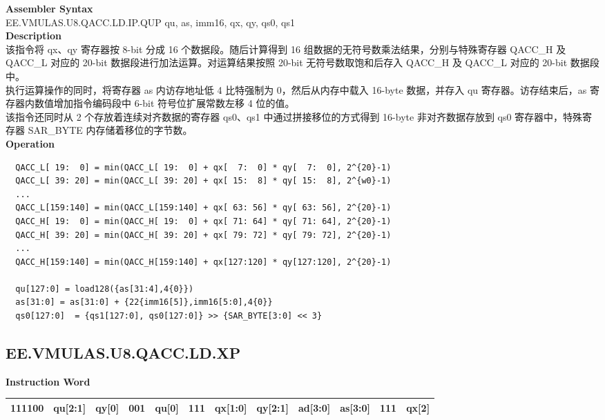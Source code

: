 \textbf{Assembler Syntax} \\
EE.VMULAS.U8.QACC.LD.IP.QUP qu, as, imm16, qx, qy, qs0, qs1 \\
\textbf{Description} \\
该指令将 qx、qy 寄存器按 8-bit 分成 16 个数据段。随后计算得到 16 组数据的无符号数乘法结果，分别与特殊寄存器 QACC\_H 及 QACC\_L 对应的 20-bit 数据段进行加法运算。对运算结果按照 20-bit 无符号数取饱和后存入 QACC\_H 及 QACC\_L 对应的 20-bit 数据段中。\\
执行运算操作的同时，将寄存器 as 内访存地址低 4 比特强制为 0，然后从内存中载入 16-byte 数据，并存入 qu 寄存器。访存结束后，as 寄存器内数值增加指令编码段中 6-bit 符号位扩展常数左移 4 位的值。\\
该指令还同时从 2 个存放着连续对齐数据的寄存器 qs0、qs1 中通过拼接移位的方式得到 16-byte 非对齐数据存放到 qs0 寄存器中，特殊寄存器 SAR\_BYTE 内存储着移位的字节数。\\
\textbf{Operation}
\begin{lstlisting}
  QACC_L[ 19:  0] = min(QACC_L[ 19:  0] + qx[  7:  0] * qy[  7:  0], 2^{20}-1)
  QACC_L[ 39: 20] = min(QACC_L[ 39: 20] + qx[ 15:  8] * qy[ 15:  8], 2^{w0}-1)
  ...
  QACC_L[159:140] = min(QACC_L[159:140] + qx[ 63: 56] * qy[ 63: 56], 2^{20}-1)
  QACC_H[ 19:  0] = min(QACC_H[ 19:  0] + qx[ 71: 64] * qy[ 71: 64], 2^{20}-1)
  QACC_H[ 39: 20] = min(QACC_H[ 39: 20] + qx[ 79: 72] * qy[ 79: 72], 2^{20}-1)
  ...
  QACC_H[159:140] = min(QACC_H[159:140] + qx[127:120] * qy[127:120], 2^{20}-1)

  qu[127:0] = load128({as[31:4],4{0}})
  as[31:0] = as[31:0] + {22{imm16[5]},imm16[5:0],4{0}}
  qs0[127:0]  = {qs1[127:0], qs0[127:0]} >> {SAR_BYTE[3:0] << 3}
\end{lstlisting}

\clearpage
\subsection{EE.VMULAS.U8.QACC.LD.XP}\label{instruction:EEVMULASU8QACCLDXP}
\setlength\tabcolsep{6pt}
\textbf{Instruction Word} \\
\begin{tabular}{|c|c|c|c|c|c|c|c|c|c|c|c|}
	\hline
	111100 & qu[2:1] & qy[0] & 001 & qu[0] & 111 & qx[1:0] & qy[2:1] & ad[3:0] & as[3:0] & 111 & qx[2] \\
	\hline
\end{tabular}


